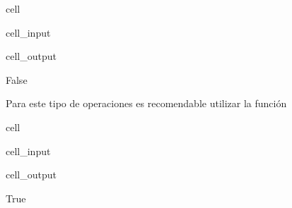 \documentclass[letterpaper,10pt,english]{jupyterBook}
\begin{document}
\begin{sphinxuseclass}{cell}\begin{sphinxVerbatimInput}

\begin{sphinxuseclass}{cell_input}
\begin{sphinxVerbatim}[commandchars=\\\{\}]
      
\end{sphinxVerbatim}

\end{sphinxuseclass}\end{sphinxVerbatimInput}
\begin{sphinxVerbatimOutput}

\begin{sphinxuseclass}{cell_output}
\begin{sphinxVerbatim}[commandchars=\\\{\}]
False
\end{sphinxVerbatim}

\end{sphinxuseclass}\end{sphinxVerbatimOutput}

\end{sphinxuseclass}
\sphinxAtStartPar
Para este tipo de operaciones es recomendable utilizar la función 

\begin{sphinxuseclass}{cell}\begin{sphinxVerbatimInput}

\begin{sphinxuseclass}{cell_input}
\begin{sphinxVerbatim}[commandchars=\\\{\}]
      
\end{sphinxVerbatim}

\end{sphinxuseclass}\end{sphinxVerbatimInput}
\begin{sphinxVerbatimOutput}

\begin{sphinxuseclass}{cell_output}
\begin{sphinxVerbatim}[commandchars=\\\{\}]
True
\end{sphinxVerbatim}

\end{sphinxuseclass}\end{sphinxVerbatimOutput}

\end{sphinxuseclass}
\end{document}
